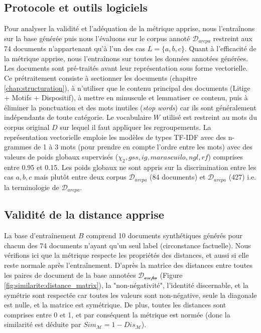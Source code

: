 \subsection{Protocole et outils logiciels}
Pour analyser la validité et l'adéquation de la métrique apprise, nous l'entraînons sur la base générée puis nous l'évaluons sur le corpus annoté $\mathcal{D}_{arcpa}$ restreint aux 74 documents n'appartenant qu'à l'un des cas $L = \lbrace a, b, c \rbrace$. Quant à l'efficacité de la métrique apprise, nous l'entraînons sur toutes les données annotées générées. Les documents sont pré-traités avant leur représentation sous forme vectorielle. Ce prétraitement consiste à sectionner les documents (chapitre \ref{chap:structuration}), à n'utiliser que le contenu principal des documents (Litige + Motifs + Dispositif), à mettre en minuscule et lemmatiser ce contenu, puis à éliminer la ponctuation et des mots inutiles (\textit{stop words})  car ils sont généralement indépendants de toute catégorie. Le vocabulaire $W$ utilisé est restreint au mots du corpus original $D$ sur lequel il faut appliquer les regroupements. La représentation vectorielle emploie les modèles de types TF-IDF avec des n-grammes de 1 à 3 mots (pour prendre en compte l'ordre entre les mots) avec des valeurs de poids globaux supervisés ($\chi_2, gss, ig, marascuilo, ngl, rf$) comprises entre 0.95 et 0.15. Les poids globaux ne sont appris sur la discrimination entre les cas $a,b,c$ mais plutôt entre deux corpus $\mathcal{D}_{arcpa}$ (84 documents) et $\mathcal{D}_{\overline{arcpa}}$ (427) i.e. la terminologie de $\mathcal{D}_{arcpa}$.

\subsection{Validité de la distance apprise}
La base d'entraînement $B$ comprend 10 documents synthétiques générés pour chacun des 74 documents n'ayant qu'un seul label (circonstance factuelle). Nous vérifions ici que la métrique respecte les propriétés des distances, et aussi si elle reste normale après l'entraînement. D'après la matrice des distances entre toutes les paires de document de la base annotées $\mathcal{D_{\text{arcpa}}}$ (Figure \ref{fig:similarite:distance_matrix}),  la "non-négativité", l'identité discernable, et la symétrie sont respectée car toutes les valeurs sont non-négative, seule la diagonale est nulle, et la matrice est symétrique. De plus, toutes les distances sont comprises entre 0 et 1, et par conséquent la métrique est normée (donc la similarité est déduite par $Sim_\mathcal{M} = 1 - Dis_\mathcal{M}$).

